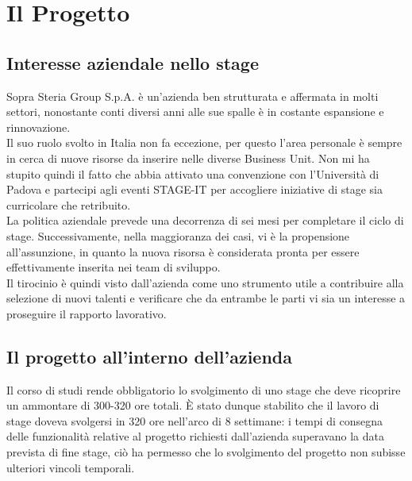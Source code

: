 
\chapter{Il Progetto}
\label{cap:progetto}


\section{Interesse aziendale nello stage}

Sopra Steria Group S.p.A. è un'azienda ben strutturata e affermata in molti settori, nonostante conti diversi anni alle sue spalle è in costante espansione e rinnovazione. \\

Il suo ruolo svolto in Italia non fa eccezione, per questo l'area personale è sempre in cerca di nuove risorse da inserire nelle diverse Business Unit. Non mi ha stupito quindi il fatto che abbia attivato una convenzione con l'Università di Padova e partecipi agli eventi STAGE-IT per accogliere iniziative di stage sia curricolare che retribuito.\\

La politica aziendale prevede una decorrenza di sei mesi per completare il ciclo di stage. Successivamente, nella maggioranza dei casi, vi è la propensione all'assunzione, in quanto la nuova risorsa è considerata pronta per essere effettivamente inserita nei team di sviluppo.\\

Il tirocinio è quindi visto dall'azienda come uno strumento utile a contribuire alla selezione di nuovi talenti e verificare che da entrambe le parti vi sia un interesse a proseguire il rapporto lavorativo.
\newpage
\section{Il progetto all'interno dell'azienda}

Il corso di studi rende obbligatorio lo svolgimento di uno stage che deve ricoprire un ammontare di 300-320 ore totali. È stato dunque stabilito che il lavoro di stage doveva svolgersi in 320 ore nell'arco di 8 settimane: i tempi di consegna delle funzionalità relative al progetto richiesti dall'azienda superavano la data prevista di fine stage, ciò ha permesso che lo svolgimento del progetto non subisse ulteriori vincoli temporali.\\
	
